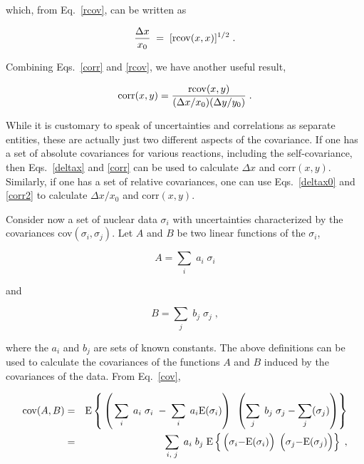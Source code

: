 \noindent
which, from Eq.~\ref{rcov}, can be written as

\begin{equation}
\frac {\Delta x}{x_0}\; =\; [{\rm rcov}(x,x)]^{1/2} \; .
\label{deltax0}
\end{equation}

\noindent
Combining Eqs.~\ref{corr} and \ref{rcov}, we have another useful result,

\begin{equation}
{\rm corr}(x,y) = \frac{{\rm rcov}(x,y)}{(\Delta x/x_0) (\Delta y/y_0)}\;.
\label{corr2}
\end{equation}

While it is customary to speak of uncertainties
and correlations as separate entities, these
are actually just two different aspects of the covariance.  If one
has a set of absolute covariances for various reactions, including
the self-covariance, then Eqs.~\ref{deltax} and \ref{corr} can be used
to calculate $\Delta x$ and corr$(x,y)$.  Similarly, if one has a set
of relative covariances, one can use Eqs.~\ref{deltax0} and
\ref{corr2} to calculate $\Delta x/x_0$ and corr$(x,y)$.

Consider now a set of nuclear data $\sigma_i$ with uncertainties
characterized by the covariances {\rm cov}$(\sigma_i,\sigma_j)$.  Let
$A$ and $B$ be two linear functions of the $\sigma_i$,

\begin{equation}
A =\sum_{i} \; a_i \; \sigma_i
\end{equation}

\noindent
and

\begin{equation}
B =\sum_{j} \; b_j \; \sigma_j \; ,
\end{equation}

\noindent
where the $a_i$ and $b_j$ are sets of known constants.  The above
definitions can be used to calculate the covariances of the functions
$A$ and $B$ induced by the covariances of the data.
From Eq.~\ref{cov},

\begin{eqnarray} {\rm cov}(A,B) & = & {\rm E} \left\{ {\vphantom{\sum_j}}\left
({\vphantom{\sum_j}}\sum_{i} \; a_i \; \sigma_i \; - \;\sum_{i}\; a_i {\rm E}
(\sigma_i)\right)\;{\vphantom{\sum_j}}\left(\sum_{j} \;b_j \;\sigma_j - \sum_{j}
(\sigma_j )\right )\right \} \nonumber \\
 & = & \sum_{i,\; j} \; a_i \; b_j \; {\rm E} \left \{ {\vphantom{\sum}}\left
({\vphantom{\sum}}\sigma_i
 {-}  {\rm E} (\sigma_i)  \right ) \;
 \left ({\vphantom{\sum}} \sigma_j{-}{\rm E} (\sigma_j) \right)  \right \}  \;,
\end{eqnarray}

